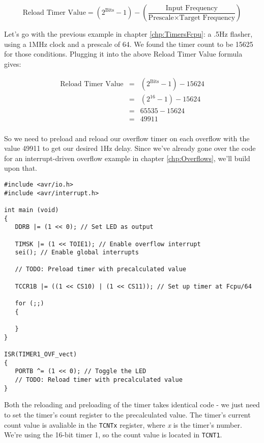 \documentclass[a4paper,oneside,notitlepage]{book}
\begin{document}
\begin{displaymath}
\text{Reload Timer Value} = (2^\text{Bits} - 1) - (\frac{\text{Input Frequency}}{\text{Prescale} \times \text{Target Frequency}})
\end{displaymath}

Let's go with the previous example in chapter \ref{chp:TimersFcpu}: a .5Hz flasher, using a 1MHz clock and a prescale of 64. We found the timer count to be 15625 for those conditions. Plugging it into the above Reload Timer Value formula gives:

\begin{displaymath}
\begin{array}{rcl}
\text{Reload Timer Value} & = & (2^\text{Bits} - 1) - 15624 \\
                          & = & (2^{16} - 1) - 15624 \\
                          & = & 65535 - 15624 \\
                          & = & 49911 \\
\end{array}
\end{displaymath}

So we need to preload and reload our overflow timer on each overflow with the value 49911 to get our desired 1Hz delay. Since we've already gone over the code for an interrupt-driven overflow example in chapter \ref{chp:Overflows}, we'll build upon that.

\begin{center}
\begin{lstlisting}
#include <avr/io.h>
#include <avr/interrupt.h>

int main (void)
{
   DDRB |= (1 << 0); // Set LED as output

   TIMSK |= (1 << TOIE1); // Enable overflow interrupt
   sei(); // Enable global interrupts

   // TODO: Preload timer with precalculated value

   TCCR1B |= ((1 << CS10) | (1 << CS11)); // Set up timer at Fcpu/64

   for (;;)
   {

   }
}

ISR(TIMER1_OVF_vect)
{
   PORTB ^= (1 << 0); // Toggle the LED
   // TODO: Reload timer with precalculated value
}
\end{lstlisting}
\end{center}

Both the reloading and preloading of the timer takes identical code - we just need to set the timer's count register to the precalculated value. The timer's current count value is avaliable in the \texttt{TCNTx} register, where \textit{x} is the timer's number. We're using the 16-bit timer 1, so the count value is located in \texttt{TCNT1}.
\end{document}
